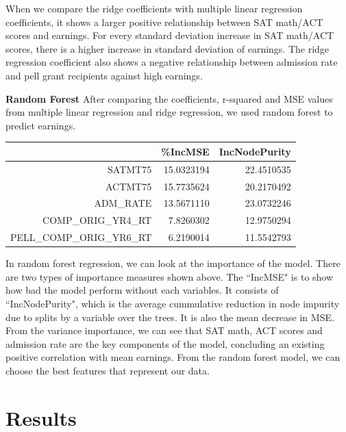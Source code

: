 \documentclass{article}
\begin{document}
  \indent When we compare the ridge coefficients with multiple linear regression coefficients, it shows a larger positive relationship between SAT math/ACT scores and earnings.  For every standard deviation increase in SAT math/ACT scores, there is a higher increase in standard deviation of earnings. The ridge regression coefficient also shows a negative relationship between admission rate and pell grant recipients against high earnings.
\newline

\noindent \textbf{Random Forest} \newline
\indent After comparing the coefficients, r-squared and MSE values from multiple linear regression and ridge regression, we used random forest to predict earnings. 

\begin{table}[ht]
\centering
\begin{tabular}{rrr}
  \hline
 & \%IncMSE & IncNodePurity \\ 
  \hline
SATMT75 & 15.0323194 & 22.4510535 \\ 
  ACTMT75 & 15.7735624 & 20.2170492 \\ 
  ADM\_RATE & 13.5671110 & 23.0732246 \\ 
  COMP\_ORIG\_YR4\_RT & 7.8260302 & 12.9750294 \\ 
  PELL\_COMP\_ORIG\_YR6\_RT & 6.2190014 & 11.5542793 \\ 
   \hline
\end{tabular}
\end{table}\noindent In random forest regression, we can look at the importance of the model. There are two types of importance measures shown above. The ``IncMSE"  is to show how bad the model perform without each variables.  It consists of ``IncNodePurity", which is the average cummulative reduction in node impurity due to splits by a variable over the trees. It is also the mean decrease in MSE.   From the variance importance, we can see that SAT math, ACT scores and admission rate are the key components of the model, concluding an existing positive correlation with mean earnings. From the random forest model, we can choose the best features that represent our data.  


\clearpage
\section{Results}
\end{document}
